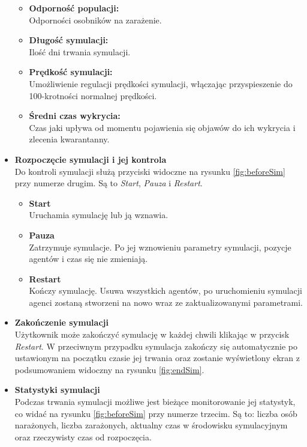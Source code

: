 \begin{itemize}
\begin{itemize}
		\item \textbf{Odporność populacji:}\\
		Odporności osobników na zarażenie.

		\item \textbf{Długość symulacji:}\\
		Ilość dni trwania symulacji.
		
		\item \textbf{Prędkość symulacji:}\\
		Umożliwienie regulacji prędkości symulacji, włączając przyspieszenie do 100-krotności normalnej prędkości.
		
		\item \textbf{Średni czas wykrycia:}\\
		Czas jaki upływa od momentu pojawienia się objawów do ich wykrycia i zlecenia kwarantanny.
	\end{itemize}
	
	\item \textbf{Rozpoczęcie symulacji i jej kontrola}\\
	Do kontroli symulacji służą przyciski widoczne na rysunku \ref{fig:beforeSim} przy numerze drugim. Są to \textit{Start}, \textit{Pauza} i \textit{Restart}. 
	
	\begin{itemize}
	\item \textbf{Start}\\
	Uruchamia symulację lub ją wznawia.
	
	\item \textbf{Pauza}\\
	Zatrzymuje symulacje. Po jej wznowieniu parametry symulacji, pozycje agentów i czas się nie zmieniają.
	
	\item \textbf{Restart}\\
	Kończy symulację. Usuwa wszystkich agentów, po uruchomieniu symulacji agenci zostaną stworzeni na nowo wraz ze zaktualizowanymi parametrami.
	\end{itemize}
	
	\item \textbf{Zakończenie symulacji}\\
	Użytkownik może zakończyć symulację w każdej chwili klikając w przycisk \textit{Restart}. W przeciwnym przypadku symulacja zakończy się automatycznie po ustawionym na początku czasie jej trwania oraz zostanie wyświetlony ekran z podsumowaniem widoczny na rysunku \ref{fig:endSim}.
	
	\item \textbf{Statystyki symulacji}\\
	Podczas trwania symulacji możliwe jest bieżące monitorowanie jej statystyk, co widać na rysunku \ref{fig:beforeSim} przy numerze trzecim. Są to: liczba osób narażonych, liczba zarażonych, aktualny czas w środowisku symulacyjnym oraz rzeczywisty czas od rozpoczęcia.
\end{itemize}

